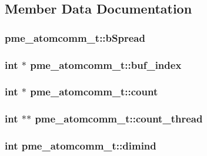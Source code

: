 \subsection{\-Member \-Data \-Documentation}
\hypertarget{structpme__atomcomm__t_a6434ce6d3dcca2cb6b503acfc7eccad2}{
\subsubsection[{b\-Spread}]{ {\bf pme\-\_\-atomcomm\-\_\-t\-::b\-Spread}}}\label{structpme__atomcomm__t_a6434ce6d3dcca2cb6b503acfc7eccad2}
\hypertarget{structpme__atomcomm__t_a1c56d8d2a2c5f6be749a82fdeddd60ef}{
\subsubsection[{buf\-\_\-index}]{\setlength{\rightskip}{0pt plus 5cm}int $\ast$ {\bf pme\-\_\-atomcomm\-\_\-t\-::buf\-\_\-index}}}\label{structpme__atomcomm__t_a1c56d8d2a2c5f6be749a82fdeddd60ef}
\hypertarget{structpme__atomcomm__t_a299ce71c7cb10b78e167443a8dabbb17}{
\subsubsection[{count}]{\setlength{\rightskip}{0pt plus 5cm}int $\ast$ {\bf pme\-\_\-atomcomm\-\_\-t\-::count}}}\label{structpme__atomcomm__t_a299ce71c7cb10b78e167443a8dabbb17}
\hypertarget{structpme__atomcomm__t_a7268dacda87fc6b699ee9963a53fef51}{
\subsubsection[{count\-\_\-thread}]{\setlength{\rightskip}{0pt plus 5cm}int $\ast$$\ast$ {\bf pme\-\_\-atomcomm\-\_\-t\-::count\-\_\-thread}}}\label{structpme__atomcomm__t_a7268dacda87fc6b699ee9963a53fef51}
\hypertarget{structpme__atomcomm__t_a8c864e347140877de0427a1319870508}{
\subsubsection[{dimind}]{\setlength{\rightskip}{0pt plus 5cm}int {\bf pme\-\_\-atomcomm\-\_\-t\-::dimind}}}\label{structpme__atomcomm__t_a8c864e347140877de0427a1319870508}

